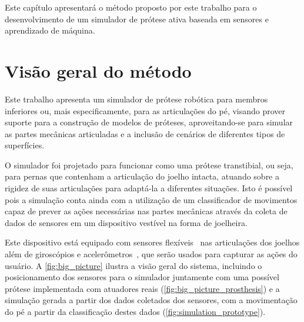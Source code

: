 Este capítulo apresentará o método proposto por este trabalho para o desenvolvimento de um simulador de prótese ativa baseada em sensores e aprendizado de máquina.

\section{Visão geral do método}\label{sec:metodo_protese}

Este trabalho apresenta um simulador de prótese robótica para membros inferiores ou, mais especificamente, para as articulações do pé, visando prover suporte para a construção de modelos de próteses, aproveitando-se para simular as partes mecânicas articuladas e a inclusão de cenários de diferentes tipos de superfícies.

O simulador foi projetado para funcionar como uma prótese transtibial, ou seja, para pernas que contenham a articulação do joelho intacta, atuando sobre a rigidez de suas articulações para adaptá-la a diferentes situações. Isto é possível pois a simulação conta ainda com a utilização de um classificador de movimentos capaz de prever as ações necessárias nas partes mecânicas através da coleta de dados de sensores em um dispositivo vestível na forma de joelheira.

Este dispositivo está equipado com sensores flexíveis~\cite{flex:datasheet} nas articulações dos joelhos além de giroscópios e acelerômetros~\cite{invensense:imu_mpu}, que serão usados para capturar as ações do usuário. A \autoref{fig:big_picture} ilustra a visão geral do sistema, incluindo o posicionamento dos sensores para o simulador juntamente com uma possível prótese implementada com atuadores reais (\autoref{fig:big_picture_prosthesis}) e a simulação gerada a partir dos dados coletados dos sensores, com a movimentação do pé a partir da classificação destes dados (\autoref{fig:simulation_prototype}).


